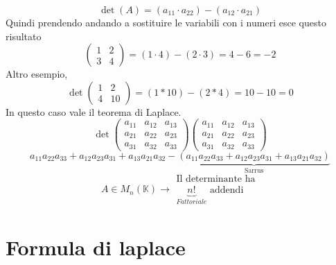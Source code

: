 \begin{equation*}
  \det(A)=(a_{11}\cdot a_{22})-(a_{12}\cdot a_{21})
\end{equation*}
Quindi prendendo andando a sostituire le variabili con i numeri esce questo
risultato
\begin{equation*}
  \begin{pmatrix}
    1 & 2 \\
    3 & 4
  \end{pmatrix}=(1 \cdot 4)- (2 \cdot 3)= 4 - 6= -2
\end{equation*}
Altro esempio,
\begin{equation*}
  \det
  \begin{pmatrix}
    1 & 2\\
    4 & 10
  \end{pmatrix}= (1* 10)-(2 * 4)= 10 - 10= 0
\end{equation*}
In questo caso vale il teorema di Laplace.
\begin{equation*}
  \det
  \begin{pmatrix}
    a_{11} & a_{12} & a_{13}\\ 
    a_{21} & a_{22} & a_{23}\\
    a_{31} & a_{32} & a_{33}
  \end{pmatrix}
  \begin{pmatrix}
    a_{11} & a_{12} & a_{13}\\ 
    a_{21} & a_{22} & a_{23}\\
    a_{31} & a_{32} & a_{33}
  \end{pmatrix}
\end{equation*}
\begin{equation*}
  a_{11}a_{22}a_{33}+a_{12}a_{23}a_{31}+a_{13}a_{21}a_{32}-\underbrace{(a_{11}a_{22}a_{33}+a_{12}a_{23}a_{31}+a_{13}a_{21}a_{32})}_{\text{Sarrus}}
\end{equation*}
\begin{equation*}
  A\in M_n(\mathds{K})\to
  \begin{array}{c}
    \text{Il determinante ha}\\
    \underbrace{n!}_{Fattoriale} \text{ addendi}
  \end{array}
\end{equation*}

\section{Formula di laplace}
\label{sec:esflaplace}

